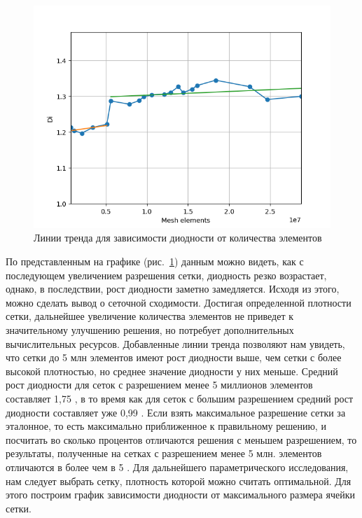 \documentclass[14pt,a4paper]{article}
\begin{document}
         
         
         
         \begin{figure}[H]
             \centering
             \includegraphics[width = 1\linewidth]{graphDiWithTrendLine}
             \caption{Линии тренда для зависимости диодности от количества элементов}
             \label{fig:graphDiWithTrendLine}
         \end{figure}     
         
         По представленным на графике (рис.~\ref{fig:graphDiWithTrendLine}) данным можно видеть, как с последующем увеличением разрешения сетки, диодность резко возрастает, однако, в последствии, рост диодности заметно замедляется. Исходя из этого, можно сделать вывод о сеточной сходимости. Достигая определенной плотности сетки, дальнейшее увеличение количества элементов не приведет к значительному улучшению решения, но потребует дополнительных вычислительных ресурсов. Добавленные линии тренда позволяют нам увидеть, что сетки до 5 млн элементов имеют рост диодности выше, чем сетки с более высокой плотностью, но среднее значение диодности у них меньше. Средний рост диодности для сеток с разрешением менее 5 миллионов элементов составляет 1,75 \textdiscount, в то время как для сеток с большим разрешением средний рост диодности составляет уже 0,99 \textdiscount. Если взять максимальное разрешение сетки за эталонное, то есть максимально приближенное к правильному решению, и посчитать во сколько процентов отличаются решения с меньшем разрешением, то результаты, полученные на сетках с разрешением менее 5 млн. элементов отличаются в более чем в 5 \textdiscount. Для дальнейшего параметрического исследования, нам следует выбрать сетку, плотность которой можно считать оптимальной. Для этого построим график зависимости диодности от максимального размера ячейки сетки.
         
\end{document}
